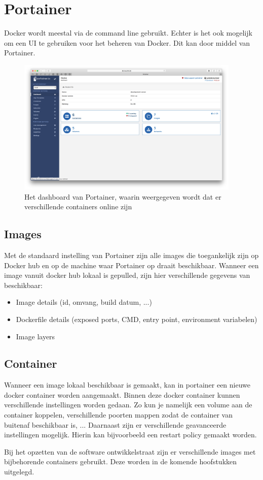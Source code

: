 \chapter{Portainer}
Docker wordt meestal via de command line gebruikt. Echter is het ook mogelijk om een UI te gebruiken voor het beheren van Docker. Dit kan door middel van Portainer.

\begin{figure}[H]
	\centering
	\includegraphics[width=0.95\textwidth]{img/PortainerDashboard.png}
	\caption{Het dashboard van Portainer, waarin weergegeven wordt dat er verschillende containers online zijn}
	\label{fig:PortainerDashboard}
\end{figure}

\section{Images}
Met de standaard instelling van Portainer zijn alle images die toegankelijk zijn op Docker hub en op de machine waar Portainer op draait beschikbaar. 
Wanneer een image vanuit docker hub lokaal is gepulled, zijn hier verschillende gegevens van beschikbaar: 
\begin{itemize}
	\setlength\itemsep{0em}
	\item Image details (id, omvang, build datum, ...)
	\item Dockerfile details (exposed ports, CMD, entry point, environment variabelen)
	\item Image layers
\end{itemize}

\section{Container}
Wanneer een image lokaal beschikbaar is gemaakt, kan in portainer een nieuwe docker container worden aangemaakt. Binnen deze docker container kunnen verschillende instellingen worden gedaan. Zo kun je namelijk een volume aan de container koppelen, verschillende poorten mappen zodat de container van buitenaf beschikbaar is, ... 
Daarnaast zijn er verschillende geavanceerde instellingen mogelijk. Hierin kan bijvoorbeeld een restart policy gemaakt worden. 

Bij het opzetten van de software ontwikkelstraat zijn er verschillende images met bijbehorende containers gebruikt. Deze worden in de komende hoofstukken uitgelegd.

